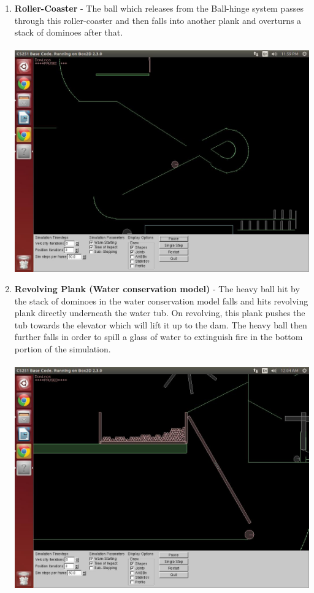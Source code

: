 \documentclass{report}
\begin{document}
\begin{enumerate}
\item \textbf{Roller-Coaster} - The ball which releases from the Ball-hinge system passes through this roller-coaster and then falls into another plank and overturns a stack of dominoes after that.\\\\
\includegraphics[scale=0.25]{pics/TunnelForBall}
\item \textbf{Revolving Plank (Water conservation model)} - The heavy ball hit by the stack of dominoes in the water conservation model falls and hits revolving plank directly underneath the water tub. On revolving, this plank pushes the tub towards the elevator which will lift it up to the dam. The heavy ball then further falls in order to spill a glass of water to extinguish fire in the bottom portion of the simulation.\\\\
\includegraphics[scale=0.25]{pics/RevolvingPlankWaterBox}
\pagebreak


\end{enumerate}
\end{document}
